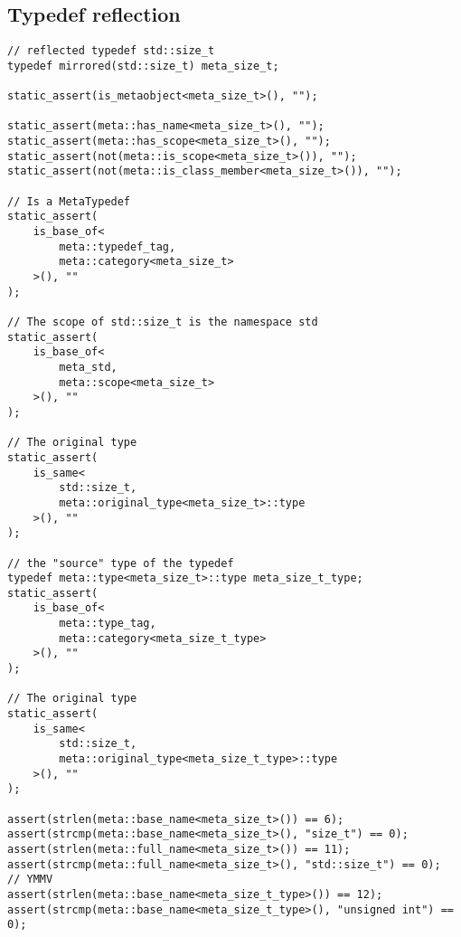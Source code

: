 \subsection{Typedef reflection}

\begin{verbatim}
// reflected typedef std::size_t
typedef mirrored(std::size_t) meta_size_t;

static_assert(is_metaobject<meta_size_t>(), "");

static_assert(meta::has_name<meta_size_t>(), "");
static_assert(meta::has_scope<meta_size_t>(), "");
static_assert(not(meta::is_scope<meta_size_t>()), "");
static_assert(not(meta::is_class_member<meta_size_t>()), "");

// Is a MetaTypedef
static_assert(
	is_base_of<
		meta::typedef_tag,
		meta::category<meta_size_t>
	>(), ""
);

// The scope of std::size_t is the namespace std
static_assert(
	is_base_of<
		meta_std,
		meta::scope<meta_size_t>
	>(), ""
);

// The original type
static_assert(
	is_same<
		std::size_t,
		meta::original_type<meta_size_t>::type
	>(), ""
);

// the "source" type of the typedef
typedef meta::type<meta_size_t>::type meta_size_t_type;
static_assert(
	is_base_of<
		meta::type_tag,
		meta::category<meta_size_t_type>
	>(), ""
);

// The original type
static_assert(
	is_same<
		std::size_t,
		meta::original_type<meta_size_t_type>::type
	>(), ""
);

assert(strlen(meta::base_name<meta_size_t>()) == 6);
assert(strcmp(meta::base_name<meta_size_t>(), "size_t") == 0);
assert(strlen(meta::full_name<meta_size_t>()) == 11);
assert(strcmp(meta::full_name<meta_size_t>(), "std::size_t") == 0);
// YMMV
assert(strlen(meta::base_name<meta_size_t_type>()) == 12);
assert(strcmp(meta::base_name<meta_size_t_type>(), "unsigned int") == 0);
\end{verbatim}

